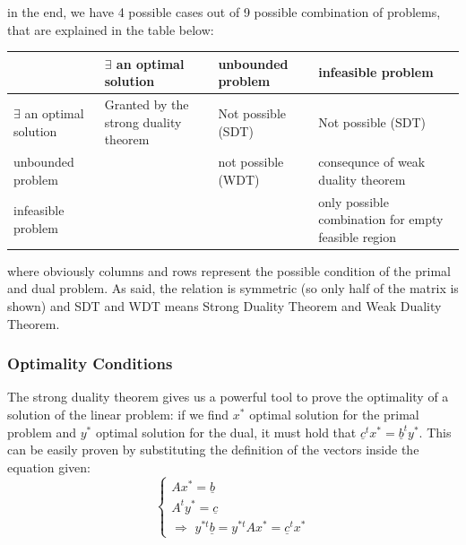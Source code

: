 \documentclass{article}
\begin{document}
				in the end, we have 4 possible cases out of 9 possible combination of problems, that are explained in the table below:
				\begin{center}
					\begin{tabular}{ m{2.5cm} || m{4cm} | m{4cm} | m{4cm} | }
						& $\exists$ an optimal solution & unbounded problem & infeasible problem \\
						\hline
						\hline
						$\exists$ an optimal solution & Granted by the strong duality theorem & Not possible (SDT) & Not possible (SDT) \\
						\hline
						unbounded problem &  & not possible (WDT) & consequnce of weak duality theorem \\
						\hline
						infeasible problem &  &  & only possible combination for empty feasible region\\
						\hline
					\end{tabular}
				\end{center}
				where obviously columns and rows represent the possible condition of the primal and dual problem. As said, the relation is symmetric (so only half of the matrix is shown) and SDT and WDT means Strong Duality Theorem and Weak Duality Theorem.

			\subsubsection{Optimality Conditions}
				The strong duality theorem gives us a powerful tool to prove the optimality of a solution of the linear problem: if we find $x^*$ optimal solution for the primal problem and $y^*$ optimal solution for the dual, it must hold that $\underline{c}^tx^* = \underline{b}^ty^*$. This can be easily proven by substituting the definition of the vectors inside the equation given:
				\begin{equation}
					\begin{cases}
						Ax^* = \underline{b} \\
						A^ty^* = \underline{c} \\
						\Rightarrow \,\, y^{*t} \underline{b} = y^{*t}Ax^* = \underline{c}^tx^*
					\end{cases}
				\end{equation}
\end{document}
